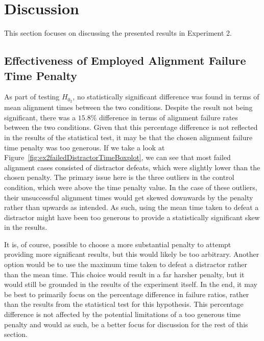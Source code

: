 \section{Discussion}\label{sec:ex2discussion}
This section focuses on discussing the presented results in Experiment 2.

\subsection{Effectiveness of Employed Alignment Failure Time Penalty}\label{sec:failurePenaltyRetrospect}
As part of testing $H_{0_2}$, no statistically significant difference was found in terms of mean alignment times between the two conditions. Despite the result not being significant, there was a $15.8\%$ difference in terms of alignment failure rates between the two conditions. Given that this percentage difference is not reflected in the results of the statistical test, it may be that the chosen alignment failure time penalty was too generous. If we take a look at Figure~\ref{fig:ex2failedDistractorTimeBoxplot}, we can see that most failed alignment cases consisted of distractor defeats, which were slightly lower than the chosen penalty. The primary issue here is the three outliers in the control condition, which were above the time penalty value. In the case of these outliers, their unsuccessful alignment times would get skewed downwards by the penalty rather than upwards as intended. As such, using the mean time taken to defeat a distractor might have been too generous to provide a statistically significant skew in the results. 

It is, of course, possible to choose a more substantial penalty to attempt providing more significant results, but this would likely be too arbitrary. Another option would be to use the maximum time taken to defeat a distractor rather than the mean time. This choice would result in a far harsher penalty, but it would still be grounded in the results of the experiment itself. In the end, it may be best to primarily focus on the percentage difference in failure ratios, rather than the results from the statistical test for this hypothesis. This percentage difference is not affected by the potential limitations of a too generous time penalty and would as such, be a better focus for discussion for the rest of this section.

